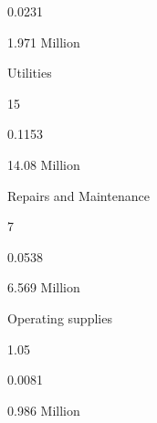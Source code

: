 \documentclass[a4paper,portrait,12pt]{article}
\begin{document}
0.0231





\begin{flushleft}
1.971 Million
\end{flushleft}





\begin{flushleft}
Utilities
\end{flushleft}





15





0.1153





\begin{flushleft}
14.08 Million
\end{flushleft}





\begin{flushleft}
Repairs and Maintenance
\end{flushleft}





7





0.0538





\begin{flushleft}
6.569 Million
\end{flushleft}





\begin{flushleft}
Operating supplies
\end{flushleft}





1.05





0.0081





\begin{flushleft}
0.986 Million
\end{flushleft}
\end{document}
